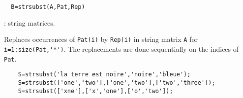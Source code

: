 
\begin{mandesc}
\end{mandesc}
\begin{calling_sequence}
\begin{verbatim}
  B=strsubst(A,Pat,Rep)
\end{verbatim}
\end{calling_sequence}

\begin{parameters}
  \begin{varlist}
    : string matrices.
  \end{varlist}
\end{parameters}

\begin{mandescription}
  Replaces occurrences of \verb+Pat(i)+ by \verb+Rep(i)+ in string matrix \verb+A+ for \verb+i=1:size(Pat,'*')+. 
  The replacements are done sequentially on the indices of \verb+Pat+.
\end{mandescription}

\begin{examples}
  \begin{Verbatim}
    S=strsubst('la terre est noire','noire','bleue');
    S=strsubst(['one','two'],['one','two'],['two','three']); 
    S=strsubst(['xne'],['x','one'],['o','two']);
  \end{Verbatim}
\end{examples}

\begin{manseealso}
\end{manseealso}
